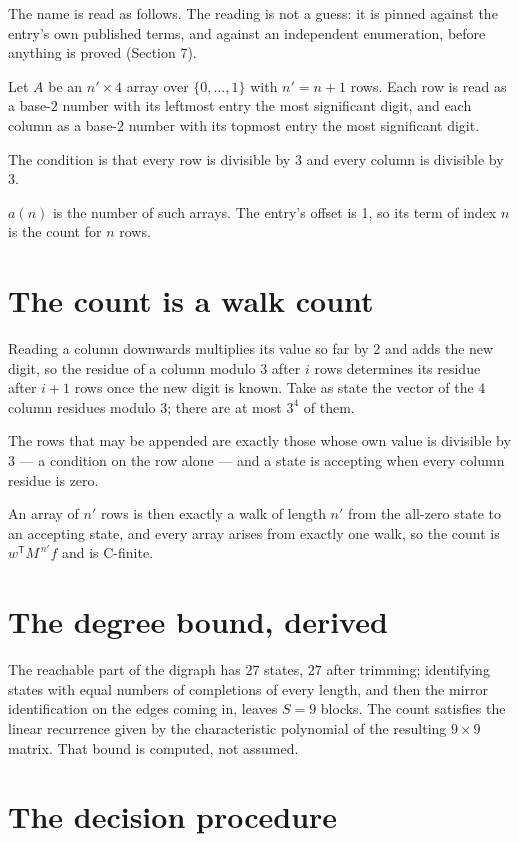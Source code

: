 \documentclass[11pt]{article}
\theoremstyle{definition}
\begin{document}
The name is read as follows. The reading is not a guess: it is pinned against the entry's own published terms, and against an independent enumeration, before anything is proved (Section 7).

Let $A$ be an $n' \times 4$ array over $\{0,\dots,1\}$ with $n' = n + 1$ rows. Each row is read as a base-$2$ number with its leftmost entry the most significant digit, and each column as a base-$2$ number with its topmost entry the most significant digit.

The condition is that every row is divisible by $3$ and every column is divisible by $3$.

$a(n)$ is the number of such arrays. The entry's offset is 1, so its term of index $n$ is the count for $n$ rows.

\section{The count is a walk count}

Reading a column downwards multiplies its value so far by $2$ and adds the new digit, so the residue of a column modulo $3$ after $i$ rows determines its residue after $i+1$ rows once the new digit is known. Take as state the vector of the $4$ column residues modulo $3$; there are at most $3^{4}$ of them.

The rows that may be appended are exactly those whose own value is divisible by $3$ --- a condition on the row alone --- and a state is accepting when every column residue is zero.

An array of $n'$ rows is then exactly a walk of length $n'$ from the all-zero state to an accepting state, and every array arises from exactly one walk, so the count is $w^{\mathsf T}M^{\,n'}f$ and is C-finite.

\section{The degree bound, derived}

The reachable part of the digraph has $27$ states, $27$ after trimming; identifying states with equal numbers of completions of every length, and then the mirror identification on the edges coming in, leaves $S = 9$ blocks. The count satisfies the linear recurrence given by the characteristic polynomial of the resulting $9\times9$ matrix. That bound is computed, not assumed.

\section{The decision procedure}
\end{document}
